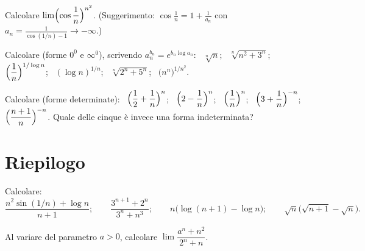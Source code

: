 \begin{esercizio}[\liv{3}]
Calcolare $\lim\Bigl(\cos\dfrac1n\Bigr)^{n^2}$. (Suggerimento: $\cos\frac1n=1+\frac1{a_n}$ con $a_n=\frac1{\cos(1/n)-1}\to-\infty$.)
\end{esercizio}

\begin{esercizio}[\liv{2}]
Calcolare (forme $0^0$ e $\infty^0$), scrivendo $a_n^{b_n}=e^{b_n\log a_n}$: \ $\sqrt[n]n$; \ $\sqrt[n]{n^2+3^n}$; \ $\Bigl(\dfrac1n\Bigr)^{1/\log n}$; \ $(\log n)^{1/n}$; \ $\sqrt[n]{2^n+5^n}$; \ $\bigl(n^n\bigr)^{1/n^2}$.
\end{esercizio}

\begin{esercizio}[\liv{1}]
Calcolare (forme determinate): \ $\Bigl(\dfrac12+\dfrac1n\Bigr)^n$; \ $\Bigl(2-\dfrac1n\Bigr)^n$; \ $\Bigl(\dfrac1n\Bigr)^n$; \ $\Bigl(3+\dfrac1n\Bigr)^{-n}$; \ $\Bigl(\dfrac{n+1}n\Bigr)^{-n}$. Quale delle cinque è invece una forma indeterminata?
\end{esercizio}

\section{Riepilogo}

\begin{esercizio}[\liv{2}]
Calcolare:
\[
\frac{n^2\sin(1/n)+\log n}{n+1};\qquad \frac{3^{n+1}+2^n}{3^n+n^3};\qquad n\bigl(\log(n+1)-\log n\bigr);\qquad \sqrt n\bigl(\sqrt{n+1}-\sqrt n\bigr).
\]
\end{esercizio}

\begin{esercizio}[\liv{3}]
Al variare del parametro $a>0$, calcolare $\lim\dfrac{a^n+n^2}{2^n+n}$.
\end{esercizio}

